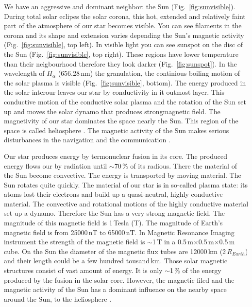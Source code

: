 \documentclass[sn-aps]{sn-jnl}%
\begin{document}
We have an aggressive and dominant neighbor: the Sun (Fig.~\ref{fig:sunvisible}). During total solar eclipes the solar corona, this hot, extended and relatively faint part of the atmosphere of our star becomes visible. You can see filaments in the corona and its shape and extension varies depending the Sun's magnetic activity (Fig.~\ref{fig:sunvisible}, top left). In visible light you can see sunspot on the disc of the Sun (Fig.~\ref{fig:sunvisible}, top right). These regions have lower temperature than their neigbourhood therefore they look darker (Fig.~\ref{fig:sunspot}). In the wavelength of $H_{\alpha}$ (656.28\,nm) the granulation, the continious boiling motion of the solar plasma is visible (Fig.~\ref{fig:sunvisible}, bottom). The energy produced in the solar interour leaves our star by conductivity in it outmost layer. This conductive motion of the conductive solar plasma and the rotation of the Sun set up and moves the solar dynamo that produces strongmagnetic field. The magnetivity of our star dominates the space nearly the Sun. This region of the space is called heliosphere \cite{stix04:_sun_introd}. The magnetic activity of the Sun makes serious disturbances in the navigation and the communication \cite{scherer05:_space_weath}. 

Our star produces energy by termonuclear fusion in its core. The produced energy flows our by radiation until $\sim$70\,\% of its radious. There the material of the Sun become convective. The energy is transported by moving material. The Sun rotates quite quickly. The material of our star is in so-called plasma state: its atoms lost their electrons and build up a quasi-neutral, highly conductive material. The convective and rotational motions of the highly conductive material set up a dynamo. Therefore the Sun has a very strong magnetic field. The magnitude of this magnetic field is 1\,Tesla (T). The magnitude of Earth's magnetic field is from 25000\,nT to 65000\,nT. In Magnetic Resonance Imaging instrument the strength of the magnetic field is $\sim$1\,T in a 0.5\,m$\times$0.5\,m$\times$0.5\,m cube. On the Sun the diameter of the magnetic flux tubes are 12000\,km (2\,$R_{Earth}$) and their length could be a few hundred tousand\,km. Those solar magnetic structures consist of vast amount of energy. It is only $\sim$1\,\% of the energy produced by the fusion in the solar core. However, the magnetic filed and the magnetic activity of the Sun has a dominant influence on the nearby space around the Sun, to the heliosphere \cite{scherer05:_space_weath,stix04:_sun_introd}.
\end{document}
